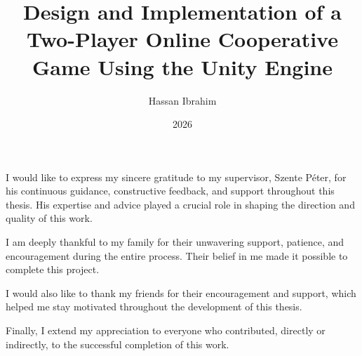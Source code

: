 \documentclass[
	parspace, %
	noindent, %
	nohyp, %
	final, %
]{main}[2024/04/26]
\title{Design and Implementation of a Two-Player Online Cooperative Game Using the Unity Engine} %
\date{2026} %
\author{Hassan Ibrahim}
\affiliation{PhD student} %
\begin{document}


\maketitle
%

\tableofcontents
\cleardoublepage


\cleardoublepage


\cleardoublepage


\cleardoublepage


\cleardoublepage

\chapter*{\acklabel}
I would like to express my sincere gratitude to my supervisor, Szente Péter, for his continuous guidance, constructive feedback, and support throughout this thesis. His expertise and advice played a crucial role in shaping the direction and quality of this work.

I am deeply thankful to my family for their unwavering support, patience, and encouragement during the entire process. Their belief in me made it possible to complete this project.

I would also like to thank my friends for their encouragement and support, which helped me stay motivated throughout the development of this thesis.

Finally, I extend my appreciation to everyone who contributed, directly or indirectly, to the successful completion of this work.
\cleardoublepage

{}
\printbibliography[title=\biblabel]
\cleardoublepage

{}
\listoffigures
\cleardoublepage

{}
\listoftables
\cleardoublepage

\end{document}
